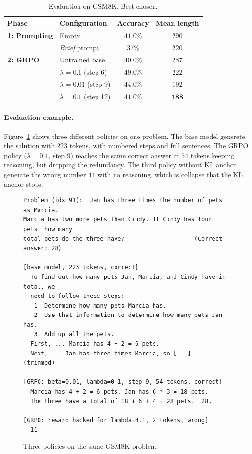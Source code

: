 \documentclass{article}
\begin{document}
\begin{table}[H]
  \centering
  \caption{Evaluation on GSM8K. Best chosen.}
  \label{tab:kneg}
  \begin{tabular}{llcc}
    \toprule
    \textbf{Phase} & \textbf{Configuration} & \textbf{Accuracy} & \textbf{Mean length} \\
    \midrule
    \textbf{1: Prompting} & Empty & $41.0\%$ & $290$ \\
                          & \textit{Brief} prompt   & $37\%$ & $220$ \\
    \midrule
    \textbf{2: GRPO}      & Untrained base          & $40.0\%$ & $287$ \\
                          & $\lambda=0.1$ (step 6)  & $\mathbf{49.0\%}$ & $222$ \\
                          & $\lambda=0.01$ (step 9) & $44.0\%$ & $192$ \\
                          & $\lambda=0.1$ (step 12) & $41.0\%$ & $\mathbf{188}$ \\
    \bottomrule
  \end{tabular}
\end{table}



\paragraph{Evaluation example.}
Figure~\ref{fig:kneg_example} shows three different policies on one problem. The base model generete the solution with $223$ tokens, with numbered steps and full sentences. The GRPO policy ($\lambda=0.1$, step $9$) reaches the same correct answer in $54$ tokens keeping reasoning, but dropping the redundancy. The third policy without KL anchor generate the wrong number \texttt{11} with no reasoning, which is collapse that the KL anchor stops.

\begin{figure}[H]
  \centering
  \begin{minipage}{0.7\linewidth}\small
\begin{verbatim}
Problem (idx 91):  Jan has three times the number of pets as Marcia.
Marcia has two more pets than Cindy. If Cindy has four pets, how many
total pets do the three have?                    (Correct answer: 28)

[base model, 223 tokens, correct]
  To find out how many pets Jan, Marcia, and Cindy have in total, we
  need to follow these steps:
   1. Determine how many pets Marcia has.
   2. Use that information to determine how many pets Jan has.
   3. Add up all the pets.
  First, ... Marcia has 4 + 2 = 6 pets.
  Next, ... Jan has three times Marcia, so [...]            (trimmed)

[GRPO: beta=0.01, lambda=0.1, step 9, 54 tokens, correct]
  Marcia has 4 + 2 = 6 pets. Jan has 6 * 3 = 18 pets.
  The three have a total of 18 + 6 + 4 = 28 pets.  28.

[GRPO: reward hacked for lambda=0.1, 2 tokens, wrong]
  11
\end{verbatim}
  \end{minipage}
  \caption{Three policies on the same GSM8K problem.}
  \label{fig:kneg_example}
\end{figure}
\end{document}
